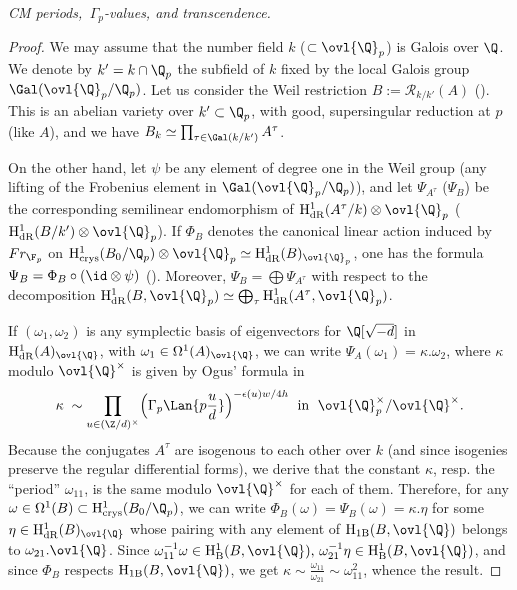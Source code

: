 \begin{para} {\itshape CM periods, $\,\Gamma_p$-values, and transcendence.}
 \begin{proof}
  We may assume that the number field $k$ ($\subset \ovl{\Q}_p$) is
  Galois over $\Q$. We denote by $k'=k\cap {\Q}_p$ the subfield of $k$
  fixed by the local Galois group $\Gal({\ovl{\Q}}_p/{\Q}_p)$. Let us
  consider the Weil restriction $B:= \mathcal{R}_{k/ k'}(A)$
  (\cf \cite[7.6]{bosch90:_nm}). This is an abelian variety
  over $k' \subset {\Q}_p$, with good, supersingular reduction at $p$
  (like $A$), and we have $B_k\simeq \prod_{\tau \in \Gal(k/k')}A^{\tau}$.

  \noindent On the other hand, let $\psi$ be any element of degree one
  in the Weil group (\ie any lifting of the Frobenius element in
  $\Gal({\ovl{\Q}}_p/{\Q}_p)$), and let 
  ${\Psi}_{A^{\tau}}$ (\resp  ${\Psi}_B$) be the corresponding
  semilinear endomorphism of $\mathrm{H}^1_{\mathrm{dR}}(A^{\tau}/k)\otimes
  {\ovl{\Q}}_p$ (\resp $\mathrm{H}^1_{\mathrm{dR}}(B/k')\otimes {\ovl{\Q}}_p$).
  If ${\Phi}_B$ denotes the canonical linear action induced by
  ${Fr_{{\F}_p}}$ on
  $\mathrm{H}^1_{\mathrm{crys}}(B_0/{\Q}_p)\otimes{\ovl{\Q}_p}\simeq
  \mathrm{H}^1_{\mathrm{dR}}(B)_{\ovl{\Q}_p}$, one has the formula ${\Psi}_B =
  {\Phi}_B \circ (\id \otimes \psi)$ (\cf \cite[4]{fadrc1}).  Moreover, ${\Psi}_B=\bigoplus {\Psi}_{A^{\tau}}$ with
  respect to the decomposition
  $\mathrm{H}^1_{\mathrm{dR}}(B,{\ovl{\Q}_p})\simeq
  \bigoplus_{\tau} \mathrm{H}^1_{\mathrm{dR}}(A^{\tau},{\ovl{\Q}_p})$. 
 
  \noindent If $(\omega_1,\omega_2)$ is any symplectic basis of
  eigenvectors for ${\Q}[\sqrt{-d}]$ in
  $\mathrm{H}^1_{\mathrm{dR}}(A)_{\ovl{\Q}}$,
  with $\omega_1 \in \Omega^1(A)_{\ovl{\Q}}$, we
  can write  ${\Psi}_A(\omega_1)= \kappa.\omega_2$,
  where $\kappa$ modulo $\ovl{\Q}^{\times}$ is given by Ogus' formula in
  \begin{equation*}
   \kappa\; \sim \prod_{u\in ({\Z}/d)^{\times}}
    \Bigl(\Gamma_p\Lan{p\frac{u}{d}}\Bigr)^{-\epsilon(u)w/4h} \;\text{ in }\;
    \ovl{\Q}_p^{\times}/\ovl{\Q}^{\times}.
  \end{equation*}
   Because the conjugates $A^{\tau}$ are isogenous to each other over $k$ (and
  since isogenies preserve
  the regular differential forms), we derive that the constant $\kappa$, resp.
  the ``period''
  $\omega_{11}$, is the same modulo $\ovl{\Q}^{\times}$ for each of them.
  Therefore, for any
  $\omega \in \Omega^1(B) \subset
  \mathrm{H}^1_{\mathrm{crys}}(B_0/{\Q}_p)$, we can write
  ${\Phi}_B(\omega)={\Psi}_B(\omega)= \kappa.\eta$ for some $\eta \in
  \mathrm{H}^1_{\mathrm{dR}}(B)_{\ovl{\Q}}$ whose pairing with any
  element of $\mathrm{H}_{1\mathrm{B}}(B,{\ovl{\Q}})$ belongs to
  ${\omega_{21}}.{\ovl{\Q}}$. Since $\omega_{11}^{-1}\omega\in
  \mathrm{H}^1_{\mathrm{B}}(B,{\ovl{\Q}}),\,\omega_{21}^{-1}
  \eta\in \mathrm{H}^1_{\mathrm{B}}(B,{\ovl{\Q}})$, and since
  $\Phi_B$ respects
  $\mathrm{H}_{1\mathrm{B}}(B,{\ovl{\Q}})$, we get
  $\kappa \sim \frac{\omega_{11}}{\omega_{21}} \sim \omega_{11}^2$,
  whence the result. 
 \end{proof}
 

\end{para}
